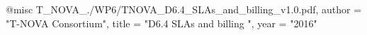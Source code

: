 @misc{ T_NOVA_./WP6/TNOVA_D6.4_SLAs_and_billing_v1.0.pdf,
       author = "{T-NOVA Consortium}",
       title = "D6.4 SLAs and billing ",
       year = "2016" }
